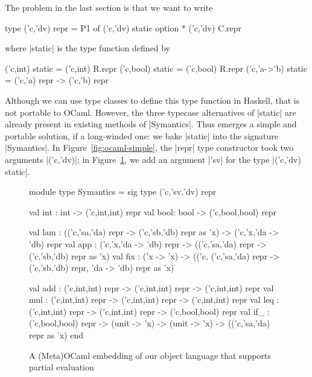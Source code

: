 The problem in the last section is that we want to write
\begin{code}
type ('c,'dv) repr = P1 of ('c,'dv) static option * ('c,'dv) C.repr
\end{code}
where |static| is the type function defined
by
\begin{code}
('c,int)    static = ('c,int) R.repr
('c,bool)   static = ('c,bool) R.repr
('c,'a->'b) static = ('c,'a) repr -> ('c,'b) repr
\end{code}
Although we can use type classes to define this type function
in Haskell, that is not portable to OCaml. However,
the three typecase alternatives of |static| are already present in existing
methods of |Symantics|.
Thus emerges
a simple and portable solution, if a long-winded one:
we bake |static| into the signature |Symantics|. 
In Figure~\ref{fig:ocaml-simple},
the |repr| type constructor took two arguments |('c,'dv)|;
in Figure~\ref{fig:ocaml},
we add an argument |'sv| for the type |('c,'dv) static|.
\begin{figure}
\begin{floatrule}
\begin{code2}
module type Symantics = sig
  type ('c,'sv,'dv) repr

  val int : int  -> ('c,int,int) repr
  val bool: bool -> ('c,bool,bool) repr

  val lam : (('c,'sa,'da) repr -> ('c,'sb,'db) repr as 'x)
            -> ('c,'x,'da -> 'db) repr
  val app : ('c,'x,'da -> 'db) repr
            -> (('c,'sa,'da) repr -> ('c,'sb,'db) repr as 'x)
  val fix : ('x -> 'x) -> (('c, ('c,'sa,'da) repr -> ('c,'sb,'db) repr,
                                'da -> 'db) repr as 'x)

  val add : ('c,int,int) repr -> ('c,int,int) repr -> ('c,int,int) repr
  val mul : ('c,int,int) repr -> ('c,int,int) repr -> ('c,int,int) repr
  val leq : ('c,int,int) repr -> ('c,int,int) repr -> ('c,bool,bool) repr
  val if_ : ('c,bool,bool) repr
            -> (unit -> 'x) -> (unit -> 'x) -> (('c,'sa,'da) repr as 'x)
end
\end{code2}
\end{floatrule}
\caption{A (Meta)OCaml embedding of our object language that supports
  partial evaluation}
\label{fig:ocaml}
\end{figure}

